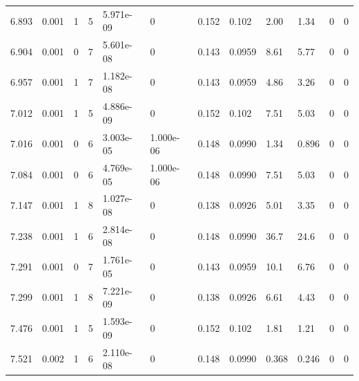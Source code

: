 \documentclass[preview]{standalone}
\begin{document}
{{{{\begin{tabular}{L{1.2cm}C{1.2cm} C{0.3cm}C{0.5cm} C{1.4cm}C{1.4cm} C{1.4cm}C{1.4cm} C{1.6cm}C{1.6cm} C{1.6cm}C{1.6cm}}
  6.893  &  0.001  & 1     &  5 &  5.971e-09  & 0  &  0.152&   0.102& 2.00 & 1.34   &  0 & 0  \\ 
  6.904  &  0.001  & 0     &  7 &  5.601e-08  & 0  &  0.143&   0.0959& 8.61 & 5.77   &  0 & 0  \\ 
  6.957  &  0.001  & 1     &  7 &  1.182e-08  & 0  &  0.143&   0.0959& 4.86 & 3.26   &  0 & 0  \\ 
  7.012  &  0.001  & 1     &  5 &  4.886e-09  & 0  &  0.152&   0.102& 7.51 & 5.03   &  0 & 0  \\ 
  7.016  &  0.001  & 0     &  6 &  3.003e-05  & 1.000e-06  &  0.148&   0.0990& 1.34 & 0.896   &  0 & 0  \\ 
  7.084  &  0.001  & 0     &  6 &  4.769e-05  & 1.000e-06  &  0.148&   0.0990& 7.51 & 5.03   &  0 & 0  \\ 
  7.147  &  0.001  & 1     &  8 &  1.027e-08  & 0  &  0.138&   0.0926& 5.01 & 3.35   &  0 & 0  \\ 
  7.238  &  0.001  & 1     &  6 &  2.814e-08  & 0  &  0.148&   0.0990& 36.7 & 24.6   &  0 & 0  \\ 
  7.291  &  0.001  & 0     &  7 &  1.761e-05  & 0  &  0.143&   0.0959& 10.1 & 6.76   &  0 & 0  \\ 
  7.299  &  0.001  & 1     &  8 &  7.221e-09  & 0  &  0.138&   0.0926& 6.61 & 4.43   &  0 & 0  \\ 
  7.476  &  0.001  & 1     &  5 &  1.593e-09  & 0  &  0.152&   0.102& 1.81 & 1.21   &  0 & 0  \\ 
  7.521  &  0.002  & 1     &  6 &  2.110e-08  & 0  &  0.148&   0.0990& 0.368 & 0.246   &  0 & 0  \\ 
\hline 
\end{tabular} 

}}}}
\end{document}
